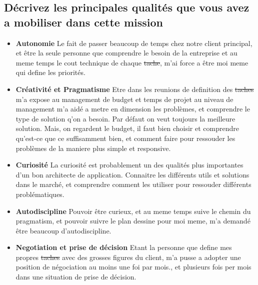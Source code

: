 \documentclass{resume} %
\providecommand{\DIFaddtex}[1]{{\protect\color{blue}\uwave{#1}}} %
\providecommand{\DIFdeltex}[1]{{\protect\color{red}\sout{#1}}}                      %
\providecommand{\DIFaddbegin}{} %
\providecommand{\DIFaddend}{} %
\providecommand{\DIFdelbegin}{} %
\providecommand{\DIFdelend}{} %
\providecommand{\DIFadd}[1]{\texorpdfstring{\DIFaddtex{#1}}{#1}} %
\providecommand{\DIFdel}[1]{\texorpdfstring{\DIFdeltex{#1}}{}} %
\begin{document}
	\subsection{Décrivez les principales qualités que vous avez a mobiliser dans cette mission}

		 \begin{itemize}  				
			\item \textbf{Autonomie} \newline
				Le fait de passer beaucoup de temps chez notre client principal, et être la seule personne que comprendre le besoin de la entreprise et au meme temps le cout technique de chaque \DIFdelbegin \DIFdel{tache}\DIFdelend \DIFaddbegin \DIFadd{tâche}\DIFaddend , m'ai force a être moi meme qui define les priorités. 
			\item \textbf{Créativité et Pragmatisme } \newline
				Etre dans les reunions de definition des \DIFdelbegin \DIFdel{taches }\DIFdelend \DIFaddbegin \DIFadd{tâches }\DIFaddend m'a expose au management de budget et temps de projet au niveau de management m'a aidé a metre en dimension les problèmes, et comprendre le type de solution q'on a besoin. Par défaut on veut toujours la meilleure solution. Mais, on regardent le budget, il faut bien choisir et comprendre qu'est-ce que ce suffisamment bien, et comment faire pour ressouder les problèmes de la maniere plus simple et responsive. 
			\item \textbf{Curiosité } \newline
				La curiosité est probablement un des qualités plus importantes d'un bon architecte de application. Connaitre les différents utils et solutions dans le marché, et comprendre comment les utiliser pour ressouder différents problématiques.
			\item \textbf{Autodiscipline} \newline
				Pouvoir être curieux, et au meme temps suive le chemin du pragmatism, et pouvoir suivre le plan dessine pour moi meme, m'a demandé être  beaucoup d'autodiscipline.
			\item \textbf{Negotiation  et prise de décision } \newline
				Etant la personne que define mes propres \DIFdelbegin \DIFdel{taches }\DIFdelend \DIFaddbegin \DIFadd{tâches }\DIFaddend avec des grosses figures du client, m'a pusse a adopter une position de négociation au moins une foi par mois., et plusieurs fois per mois dans une situation de prise de décision.  
		 \end{itemize} 
\end{document}
